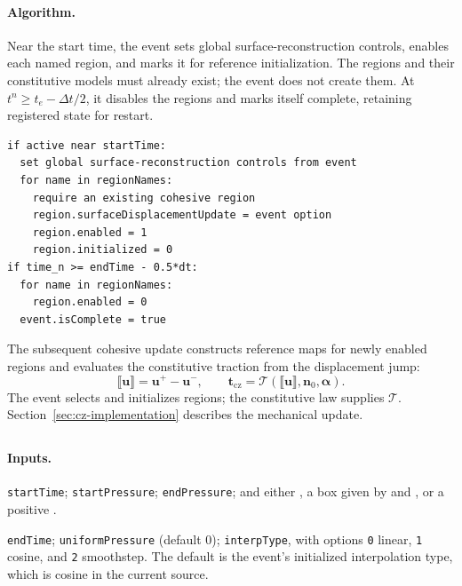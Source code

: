 \paragraph{Algorithm.}
Near the start time, the event sets global surface-reconstruction controls, enables each named region, and marks it for reference initialization. The regions and their constitutive models must already exist; the event does not create them. At $t^n\ge t_e-\Delta t/2$, it disables the regions and marks itself complete, retaining registered state for restart.
\begin{lstlisting}[caption={ReferenceCohesiveZones event pseudocode.}]
if active near startTime:
  set global surface-reconstruction controls from event
  for name in regionNames:
    require an existing cohesive region
    region.surfaceDisplacementUpdate = event option
    region.enabled = 1
    region.initialized = 0
if time_n >= endTime - 0.5*dt:
  for name in regionNames:
    region.enabled = 0
  event.isComplete = true
\end{lstlisting}

The subsequent cohesive update constructs reference maps for newly enabled regions and evaluates the constitutive traction from the displacement jump:
\begin{equation}
 \llbracket\mathbf u\rrbracket=\mathbf u^+-\mathbf u^-,
 \qquad \mathbf t_{\mathrm{cz}}=\mathcal T(\llbracket\mathbf u\rrbracket,\mathbf n_0,\boldsymbol\alpha).
 \label{eq:cz-traction}
\end{equation}
The event selects and initializes regions; the constitutive law supplies $\mathcal T$. Section~\ref{sec:cz-implementation} describes the mechanical update.

\subsection{}
\label{subsec:event-confining-pressure}

\paragraph{Inputs.}
\begin{description}[leftmargin=*,style=nextline]
\item[\textbf{Required.}] \texttt{startTime}; \texttt{startPressure}; \texttt{endPressure}; and either , a box given by  and , or a positive .
\item[\textbf{Optional.}] \texttt{endTime}; \texttt{uniformPressure} (default 0); \texttt{interpType}, with options \texttt{0} linear, \texttt{1} cosine, and \texttt{2} smoothstep.  The default is the event's initialized interpolation type, which is cosine in the current source.
\end{description}

